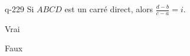 \begin{truefalse}{q-229}
Si $ABCD$ est un carré direct, alors $\frac{d-b}{c-a} =i$.
\item* Vrai
\item Faux
\end{truefalse}

